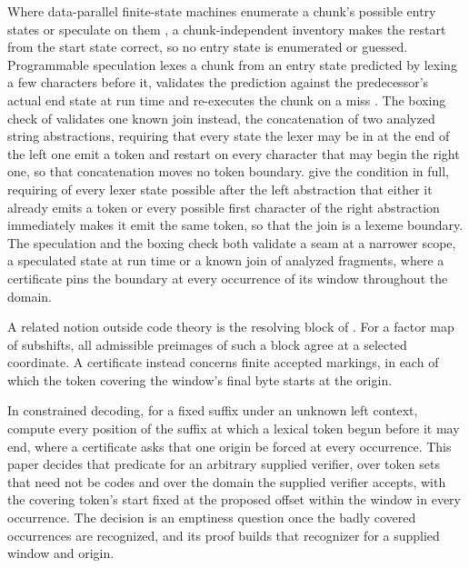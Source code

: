 \documentclass[11pt,a4paper]{article}
\theoremstyle{definition}
\theoremstyle{plain}
\begin{document}
Where data-parallel finite-state machines enumerate a chunk's possible entry states \citep{mytkowicz2014data} or
speculate on them \citep{zhao2014challenging}, a chunk-independent inventory makes the restart from the start state
correct, so no entry state is enumerated or guessed. Programmable speculation lexes a chunk from an entry state
predicted by lexing a few characters before it, validates the prediction against the predecessor's actual end state at
run time and re-executes the chunk on a miss \citep{prabhu2010speculative}. The boxing check of
\citet[Section~3.4]{lester2013boxing} validates one known join instead, the concatenation of two analyzed string
abstractions, requiring that every state the lexer may be in at the end of the left one emit a token and restart on
every character that may begin the right one, so that concatenation moves no token boundary.
\citet[Section~5.2.3]{lester2016flow} give the condition in full, requiring of every lexer state possible after the left
abstraction that either it already emits a token or every possible first character of the right abstraction immediately
makes it emit the same token, so that the join is a lexeme boundary. The speculation and the boxing check both validate
a seam at a narrower scope, a speculated state at run time or a known join of analyzed fragments, where a certificate
pins the boundary at every occurrence of its window throughout the domain.

A related notion outside code theory is the resolving block of \citet[Definition~3.3]{adler1983sliding}. For a factor
map of subshifts, all admissible preimages of such a block agree at a selected coordinate. A certificate instead
concerns finite accepted markings, in each of which the token covering the window's final byte starts at the origin.

In constrained decoding, for a fixed suffix under an unknown left context, \citet[Section~5.3.1]{melcer2024constrained}
compute every position of the suffix at which a lexical token begun before it may end, where a certificate asks that one
origin be forced at every occurrence. This paper decides that predicate for an arbitrary supplied verifier, over token
sets that need not be codes and over the domain the supplied verifier accepts, with the covering token's start fixed at
the proposed offset within the window in every occurrence. The decision is an emptiness question once the badly covered
occurrences are recognized, and its proof builds that recognizer for a supplied window and origin.
\end{document}
